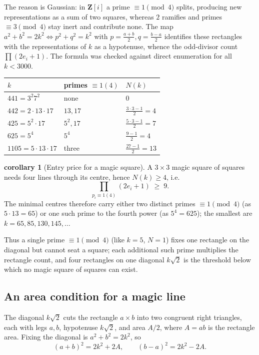 \documentclass[11pt]{article}
\theoremstyle{definition}
\newtheorem{corollary}{corollary}
\begin{document}
\noindent The reason is Gaussian: in $\mathbf{Z}[i]$ a prime $\equiv1\pmod4$
splits, producing new representations as a sum of two squares, whereas $2$
ramifies and primes $\equiv3\pmod4$ stay inert and contribute none. The map
$a^{2}+b^{2}=2k^{2}\Leftrightarrow p^{2}+q^{2}=k^{2}$ with $p=\tfrac{a+b}{2},
q=\tfrac{b-a}{2}$ identifies these rectangles with the representations of $k$ as a
hypotenuse, whence the odd-divisor count $\prod(2e_i+1)$. The formula was checked
against direct enumeration for all $k<3000$.

\begin{center}
\begin{tabular}{lll}
\hline
$k$ & primes $\equiv1(4)$ & $N(k)$\\
\hline
$441=3^{2}7^{2}$   & none          & $0$\\
$442=2\cdot13\cdot17$ & $13,17$     & $\tfrac{3\cdot3-1}{2}=4$\\
$425=5^{2}\cdot17$  & $5^{2},17$    & $\tfrac{5\cdot3-1}{2}=7$\\
$625=5^{4}$         & $5^{4}$       & $\tfrac{9-1}{2}=4$\\
$1105=5\cdot13\cdot17$ & three      & $\tfrac{27-1}{2}=13$\\
\hline
\end{tabular}
\end{center}

\begin{corollary}[Entry price for a magic square]\label{cor:entry}
A $3\times3$ magic square of squares needs four lines through its centre, hence
$N(k)\ge4$, i.e.
\[
  \prod_{p_i\equiv1(4)}(2e_i+1)\;\ge\;9.
\]
The minimal centres therefore carry either two distinct primes $\equiv1\pmod4$
(as $5\cdot13=65$) or one such prime to the fourth power (as $5^{4}=625$); the
smallest are $k=65,85,130,145,\dots$
\end{corollary}

\noindent Thus a single prime $\equiv1\pmod4$ (like $k=5$, $N=1$) fixes one
rectangle on the diagonal but cannot seat a square; each additional such prime
multiplies the rectangle count, and four rectangles on one diagonal $k\sqrt2$ is
the threshold below which no magic square of squares can exist.

\subsection{An area condition for a magic line}

The diagonal $k\sqrt2$ cuts the rectangle $a\times b$ into two congruent right
triangles, each with legs $a,b$, hypotenuse $k\sqrt2$, and area $A/2$, where
$A=ab$ is the rectangle area. Fixing the diagonal is $a^{2}+b^{2}=2k^{2}$, so
\[
  (a+b)^{2}=2k^{2}+2A,\qquad (b-a)^{2}=2k^{2}-2A.
\]
\end{document}
